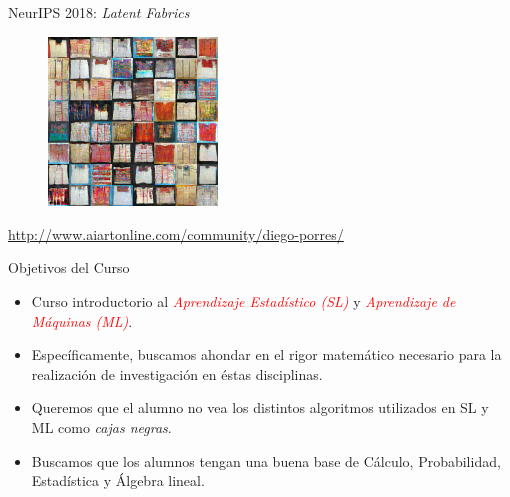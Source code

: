 \documentclass[usenames,dvipsnames]{beamer} %
\newcommand\bred[1]{\textcolor{red}{\textit{#1}}}
\begin{document}
\begin{frame}{NeurIPS 2018: \textit{Latent Fabrics}}
\begin{figure}
	\centering
	\includegraphics[width=0.4\textwidth]{latent/t-49.png}
\end{figure}

    \begin{center}

        \href{http://www.aiartonline.com/community/diego-porres/}{http://www.aiartonline.com/community/diego-porres/}
    \end{center}
\end{frame}

\begin{frame}{Objetivos del Curso}
    
    \begin{itemize}
        \item Curso introductorio al \bred{Aprendizaje Estad\'istico (SL)} y \bred{Aprendizaje de M\'aquinas (ML)}.
        \item Espec\'ificamente, buscamos ahondar en el rigor matem\'atico necesario para la realizaci\'on de investigaci\'on en \'estas disciplinas.
        \item Queremos que el alumno no vea los distintos algoritmos utilizados en SL y ML como \textit{cajas negras}. 
        \item Buscamos que los alumnos tengan una buena base de C\'alculo, Probabilidad, Estad\'istica y \'Algebra lineal.
    \end{itemize}
\end{frame}
\end{document}
